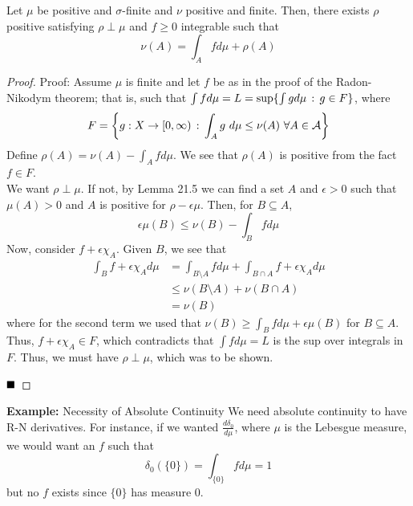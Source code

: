 
\begin{theorem}
    Let $\mu$ be positive and $\sigma$-finite and $\nu$ positive and finite. Then, there exists $\rho$ positive satisfying $\rho \perp \mu$ and $f \geq 0$ integrable such that
    \[ \nu(A) = \int_{A} f d\mu + \rho(A) \]
\end{theorem}
\begin{proof}{Proof:}
    Assume $\mu$ is finite and let $f$ be as in the proof of the Radon-Nikodym theorem; that is, such that $\int f d\mu = L = \sup\{\int g d\mu \, :\, g \in F\}$, where
    \[ F = \left\{g : X \to [0, \infty) \, :\, \int_{A} g\ d\mu \leq \nu(A)\ \forall A \in \mathcal{A}\right\} \]
    Define $\rho(A) = \nu(A) - \int_{A} f d\mu$. We see that $\rho(A)$ is positive from the fact $f \in F$.\\

    We want $\rho \perp \mu$. If not, by Lemma 21.5 we can find a set $A$ and $\epsilon > 0$ such that $\mu(A) > 0$ and $A$ is positive for $\rho - \epsilon\mu$. Then, for $B \subseteq A$,
    \[ \epsilon\mu(B) \leq \nu(B) - \int_{B} f d\mu \]
    Now, consider $f + \epsilon\chi_A$. Given $B$, we see that
    \begin{align*}
        \int_{B} f + \epsilon\chi_A d\mu &= \int_{B \setminus A} f d\mu + \int_{B \cap A} f + \epsilon\chi_A d\mu\\
        &\leq \nu(B \setminus A) + \nu(B \cap A)\\
        &= \nu(B)
    \end{align*}
    where for the second term we used that $\nu(B) \geq \int_{B} f d\mu + \epsilon\mu(B)$ for $B \subseteq A$.\\

    Thus, $f + \epsilon \chi_{A} \in F$, which contradicts that $\int f d\mu = L$ is the sup over integrals in $F$. Thus, we must have $\rho \perp \mu$, which was to be shown.

    $\qed$
\end{proof}

\begin{example}{\textbf{Example:} Necessity of Absolute Continuity}
    We need absolute continuity to have R-N derivatives. For instance, if we wanted $\frac{d\delta_0}{d\mu}$, where $\mu$ is the Lebesgue measure, we would want an $f$ such that
    \[ \delta_0(\{0\}) = \int_{\{0\}} f d\mu = 1 \]
    but no $f$ exists since $\{0\}$ has measure $0$.
\end{example}

